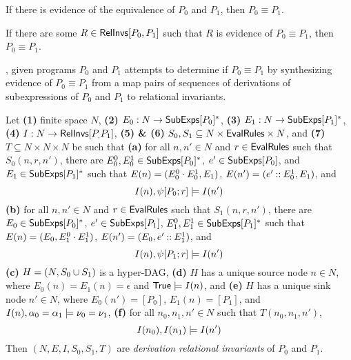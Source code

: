 \begin{ex}
  \label{ex:rel-invs}
\end{ex}

If there is evidence of the equivalence of $P_0$ and $P_1$, then $P_0
\equiv P_1$.
%
\begin{lemma}
  \label{lemma:equiv-evidence}
  If there are some $R \in \mathsf{RelInvs}[ P_0, P_1 ]$ such that $R$ is
  evidence of $P_0 \equiv P_1$, then $P_0 \equiv P_1$.
\end{lemma}

\sys, given programs $P_0$ and $P_1$ attempts to determine if $P_0
\equiv P_1$ by synthesizing evidence of $P_0 \equiv P_1$ from a map
pairs of sequences of derivations of subexpressions of $P_0$ and $P_1$
to relational invariants.
%
\begin{defn}
  \label{defn:der-rel-invs}
  Let \textbf{(1)} finite space $N$, %
  \textbf{(2)} $E_0 : N \to \mathsf{SubExps}[ P_0 ]^{*}$, %
  \textbf{(3)} $E_1 : N \to \mathsf{SubExps}[ P_1 ]^{*}$, %
  \textbf{(4)} $I: N \to \mathsf{RelInvs}[ P_, P_1 ]$,
  \textbf{(5) \& (6)} $S_0, S_1 \subseteq N \times \mathsf{EvalRules} \times
  N$, and
  \textbf{(7)} $T \subseteq N \times N \times N$ be such that 
  \textbf{(a)} for all $n, n' \in N$ and $r \in \mathsf{EvalRules}$ such that
  $S_0(n, r, n')$, there are $E_0^0, E_0^1 \in
  \mathsf{SubExps}[ P_0 ]^{*}$, $e' \in \mathsf{SubExps}[ P_0 ]$, and $E_1 \in
  \mathsf{SubExps}[ P_1 ]^{*}$ such that $E(n) = (E_0^0 \cdot E_0^1, E_1)$,
  $E(n') = (e' \mathbin{::} E_0^1, E_1)$, and
  \[ I(n), \psi[  P_0  ;  r  ] \models I(n')
  \]
  \textbf{(b)} for all $n, n' \in N$ and $r \in \mathsf{EvalRules}$ such that
  $S_1(n, r, n')$, there are $E_0 \in \mathsf{SubExps}[ P_0 ]^{*}$, $e' \in
  \mathsf{SubExps}[ P_1 ]$, $E_1^0, E_1^1 \in \mathsf{SubExps}[ P_1 ]^{*}$ such that $E(n)
  = (E_0, E_1^0 \cdot E_1^1)$, $E(n') = (E_0, e' \mathbin{::} E_1^1)$, and
  \[ I(n), \psi[  P_1  ;  r  ] \models I(n') 
  \]
  \textbf{(c)} $H = (N, S_0 \cup S_1)$ is a hyper-DAG,
  \textbf{(d)} $H$ has a unique source node $n \in N$, where $E_0(n) =
  E_1(n) = \epsilon$ and $\mathsf{True} \models I(n)$, and
  \textbf{(e)} $H$ has a unique sink node $n' \in N$, where $E_0(n') =
  [ P_0 ]$, $E_1(n) = [ P_1 ]$, and $I(n), \alpha_0 = \alpha_1
  \models \nu_0 = \nu_1$, %
  \textbf{(f)} for all $n_0, n_1, n' \in N$ such that $T(n_0, n_1,
  n')$,
  \[ I(n_0), I(n_1) \models I(n')
  \]
  Then $(N, E, I, S_0, S_1, T)$ are \emph{derivation relational
    invariants} of $P_0$ and $P_1$.
\end{defn}
